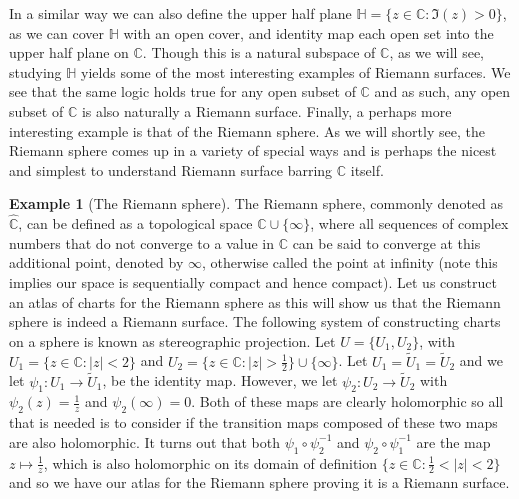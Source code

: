 \documentclass[11pt]{report}
\theoremstyle{definition}
\newtheorem{example}[thm]{Example}
\begin{document}
In a similar way we can also define the upper half plane $\mathbb{H}=\{ z \in \mathbb{C} \colon \Im(z)>0\}$, as we can cover $\mathbb{H}$ with an open cover, and identity map each open set into the upper half plane on $\mathbb{C}$. Though this is a natural subspace of $\mathbb{C}$, as we will see, studying $\mathbb{H}$ yields some of the most interesting examples of Riemann surfaces. We see that the same logic holds true for any open subset of $\mathbb{C}$ and as such, any open subset of $\mathbb{C}$ is also naturally a Riemann surface. Finally, a perhaps more interesting example is that of the Riemann sphere. As we will shortly see, the Riemann sphere comes up in a variety of special ways and is perhaps the nicest and simplest to understand Riemann surface barring $\mathbb{C}$ itself.

\begin{example}[The Riemann sphere]
  The Riemann sphere, commonly denoted as $\hat{\mathbb{C}}$, can be defined as a topological space $\mathbb{C} \cup \{\infty\}$, where all sequences of complex numbers that do not converge to a value in $\mathbb{C}$ can be said to converge at this additional point, denoted by $\infty$, otherwise called the point at infinity (note this implies our space is sequentially compact and hence compact). Let us construct an atlas of charts for the Riemann sphere as this will show us that the Riemann sphere is indeed a Riemann surface. The following system of constructing charts on a sphere is known as stereographic projection. Let $U=\{U_1,U_2\}$, with $U_1=\{z \in \mathbb{C} : |z| < 2\}$ and $U_2=\{z \in \mathbb{C} : |z| > \frac{1}{2}\}\cup \{\infty\}$. Let $U_1=\tilde{U}_1=\tilde{U}_2$ and we let $\psi_1:U_1 \rightarrow \tilde{U}_1$, be the identity map. However, we let $\psi_2:U_2 \rightarrow \tilde{U}_2$ with $\psi_2(z)=\frac{1}{z}$ and $\psi_2(\infty)=0$. Both of these maps are clearly holomorphic so all that is needed is to consider if the transition maps composed of these two maps are also holomorphic.
  It turns out that both $\psi_1 \circ \psi_2 ^{-1}$ and $\psi_2 \circ \psi_1 ^{-1}$ are the map $z \mapsto \frac{1}{z}$, which is also holomorphic on its domain of definition $\{z\in \mathbb{C} : \frac{1}{2} < |z| < 2\}$ and so we have our atlas for the Riemann sphere proving it is a Riemann surface.
\end{example}
\end{document}
